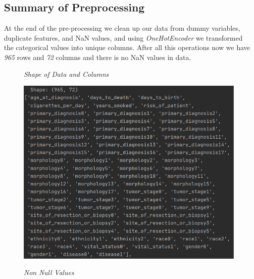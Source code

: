 \documentclass[onecolumn]{article}
\begin{document}
\subsection{Summary of Preprocessing}
At the end of the pre-processing we clean up our data from dummy variables, duplicate features, and NaN values, and using \emph{OneHotEncoder} we transformed the categorical values into unique columns. After all this operations now we have \emph{965} rows and \emph{72} columns and there is no NaN values in data.
\begin{figure}[h]
    \centering
    \begin{minipage}{0.4\textwidth}
        \emph{\small Shape of Data and Columns}\par\medskip
        \centering
        \includegraphics[width=1.2\textwidth]{endofpreprocess.png} %
    \end{minipage}\hfill
    \begin{minipage}{0.4\textwidth}
        \emph{\small Non Null Values}\par\medskip
        \centering

\end{minipage}
\end{figure}
\end{document}
